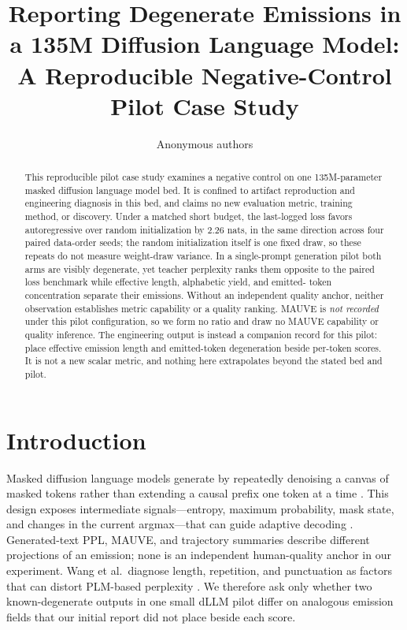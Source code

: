 \documentclass{article}
\title{\mbox{Reporting} \mbox{Degenerate} \mbox{Emissions} \mbox{in} \mbox{a} \mbox{135M} \mbox{Diffusion} \mbox{Language} \mbox{Model}:\\
A \mbox{Reproducible} \mbox{Negative-Control} \mbox{Pilot} Case Study}
\author{Anonymous authors}
\begin{document}
\maketitle

\begin{abstract}
This reproducible pilot case study examines a negative control on one
135M-parameter masked diffusion language model bed.  It is confined to
artifact reproduction and engineering diagnosis in this bed, and claims no
new evaluation metric, training method, or discovery.  Under a matched short
budget, the last-logged loss favors autoregressive over random initialization
by 2.26 nats, in the same direction across four paired data-order seeds; the
random initialization itself is one fixed draw, so these repeats do not
measure weight-draw variance.  In a single-prompt generation pilot both arms
are visibly degenerate, yet teacher perplexity ranks them opposite to the
paired loss benchmark while effective length, alphabetic yield, and emitted-
token concentration separate their emissions.  Without an independent
quality anchor, neither observation establishes metric capability or a
quality ranking.  MAUVE is \emph{not recorded} under this pilot configuration,
so we form no ratio and draw no MAUVE capability or quality inference.  The
engineering output is instead a companion record for this pilot: place
effective emission length and emitted-token degeneration beside per-token
scores.  It is
not a new scalar metric, and nothing here extrapolates beyond the stated bed
and pilot.
\end{abstract}

\section{Introduction}
\label{sec:introduction}

Masked diffusion language models generate by repeatedly denoising a canvas of
masked tokens rather than extending a causal prefix one token at a time
\citep{sahoo2024mdlm,nie2025llada}.  This design exposes intermediate
signals---entropy, maximum probability, mask state, and changes in the current
argmax---that can guide adaptive decoding \citep{li2025daedal}.  Generated-text
PPL, MAUVE, and trajectory summaries describe different projections of an
emission; none is an independent human-quality anchor in our experiment.
Wang et al.\ diagnose length, repetition, and punctuation as factors that can
distort PLM-based perplexity \citep{wang2022ppl}.  We therefore ask only whether
two known-degenerate outputs in one small dLLM pilot differ on analogous
emission fields that our initial report did not place beside each score.
\end{document}
